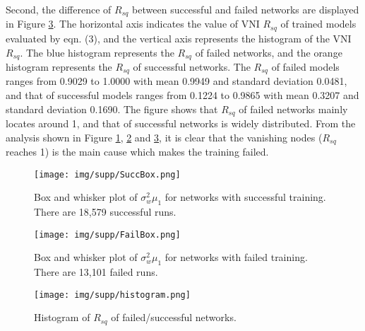Second, the difference of $R_{sq}$ between successful and failed networks are displayed in Figure \ref{fig:histogram}.
The horizontal axis indicates the value of VNI $R_{sq}$ of trained models evaluated by eqn. (3), and the vertical axis represents the histogram of the VNI $R_{sq}$.
The blue histogram represents the $R_{sq}$ of failed networks, and the orange histogram represents the $R_{sq}$ of successful networks.
The $R_{sq}$ of failed models ranges from 0.9029 to 1.0000 with mean 0.9949 and standard deviation 0.0481, and that of successful models ranges from 0.1224 to 0.9865 with mean 0.3207 and standard deviation 0.1690.
The figure shows that $R_{sq}$ of failed networks mainly locates around 1, and that of successful networks is widely distributed.
From the analysis shown in Figure \ref{fig:succ_box}, \ref{fig:fail_box} and \ref{fig:histogram}, it is clear that the vanishing nodes ($R_{sq}$ reaches 1) is the main cause which makes the training failed.

\begin{figure}[h]
    \centering
    \texttt{[image: img/supp/SuccBox.png]}
    \caption{Box and whisker plot of $\sigma_w^2\mu_1$ for networks with successful training. There are 18,579 successful runs.
    }
    \label{fig:succ_box}
\end{figure}

\begin{figure}[h]
    \centering
    \texttt{[image: img/supp/FailBox.png]}
    \caption{Box and whisker plot of $\sigma_w^2\mu_1$ for networks with failed training. There are 13,101 failed runs.
    }
    \label{fig:fail_box}
\end{figure}

\begin{figure}[h]
    \centering
    \texttt{[image: img/supp/histogram.png]}
    \caption{Histogram of $R_{sq}$ of failed/successful  networks.}
    \label{fig:histogram}
\end{figure}

